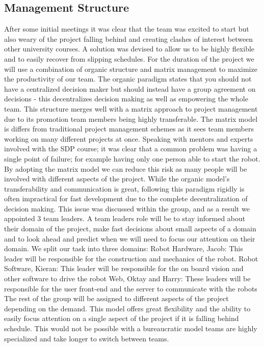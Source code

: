 \documentclass[12pt]{article}
\begin{document}
\subsection*{Management Structure}
After some initial meetings it was clear that the team was excited to start but also weary of the project falling behind and creating clashes of interest between other university courses. A solution was devised to allow us to be highly flexible and to easily recover from slipping schedules. 
\newline\newline
For the duration of the project we will use a combination of organic structure and matrix management to maximize the productivity of our team. The organic paradigm states that you should not have a centralized decision maker but should instead have a group agreement on decisions - this decentralizes decision making as well as empowering the whole team. This structure merges well with a matrix approach to project management due to its promotion team members being highly transferable. 
\newline\newline
The matrix model is differs from traditional project management schemes as it sees team members working on many different projects at once. Speaking with mentors and experts involved with the SDP course; it was clear that a common problem was having a single point of failure; for example having only one person able to start the robot. By adopting the matrix model we can reduce this risk as many people will be involved with different aspects of the project.
\newline\newline
While the organic model’s transferability and communication is great, following this paradigm rigidly is often impractical for fast development due to the complete decentralization of decision making. This issue was discussed within the group, and as a result we appointed 3 team leaders.
\newline\newline
A team leaders role will be to stay informed about their domain of the project, make fast decisions about small aspects of a domain and to look ahead and predict when we will need to focus our attention on their domain. We split our task into three domains:
\newline
Robot Hardware, Jacob: This leader will be responsible for the construction and mechanics of the robot. 
Robot Software, Kieran: This leader will be responsible for the on board vision and other software to drive the robot
Web, Oktay and Harry: These leaders will be responsible for the user front-end and the server to communicate with the robots
\newline\newline
The rest of the group will be assigned to different aspects of the project depending on the demand. This model offers great flexibility and the ability to easily focus attention on a single aspect of the project if it is falling behind schedule. This would not be possible with a bureaucratic model teams are highly specialized and take longer to switch between teams. 
\end{document}
